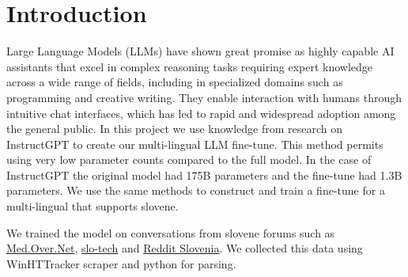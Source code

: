 \documentclass[fleqn,moreauthors,10pt]{ds_report}
\affiliation{\textit{Advisors: Slavko Žitnik}}
\begin{document}
\flushbottom 

\maketitle 

\thispagestyle{empty} 


\section*{Introduction}
Large Language Models (LLMs) have shown great promise as highly capable AI assistants that excel in complex reasoning tasks requiring expert knowledge across a wide range of fields, including in specialized domains such as programming and creative writing. They enable interaction with humans through intuitive chat interfaces, which has led to rapid and widespread adoption among the general public.
In this project we use knowledge from research on InstructGPT to create our multi-lingual LLM fine-tune. This method permits using very low parameter counts compared to the full model. In the case of InstructGPT the original model had 175B parameters and the fine-tune had 1.3B parameters. We use the same methods to construct and train a fine-tune for a multi-lingual that supports slovene.

We trained the model on conversations from slovene forums such as \href{https://forum.over.net/forum/}{Med.Over.Net}, \href{www.slo-tech.com}{slo-tech} and \href{https://www.reddit.com/r/Slovenia/}{Reddit Slovenia}. We collected this data using WinHTTracker scraper and python for parsing.


	
\end{document}
